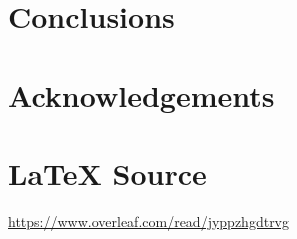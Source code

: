 \documentclass{article}
\theoremstyle{definition}
\begin{document}
\section{Conclusions}
\label{sec:conclusions}
%
%
%
\section{Acknowledgements}
\label{sec:acknowledgements}
%
%
\section*{\LaTeX \hspace{0.10 mm} Source}
\url{https://www.overleaf.com/read/jyppzhgdtrvg}
%
%
%


%
%
\end{document}

